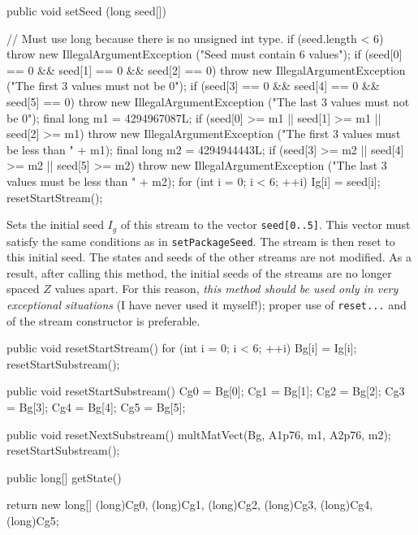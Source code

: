 \begin{code}

   public void setSeed (long seed[]) \begin{hide} {
      // Must use long because there is no unsigned int type.
      if (seed.length < 6)
         throw new IllegalArgumentException ("Seed must contain 6 values");
      if (seed[0] == 0 && seed[1] == 0 && seed[2] == 0)
         throw new IllegalArgumentException
            ("The first 3 values must not be 0");
      if (seed[3] == 0 && seed[4] == 0 && seed[5] == 0)
         throw new IllegalArgumentException
            ("The last 3 values must not be 0");
      final long m1 = 4294967087L;
      if (seed[0] >= m1 || seed[1] >= m1 || seed[2] >= m1)
         throw new IllegalArgumentException
            ("The first 3 values must be less than " + m1);
      final long m2 = 4294944443L;
      if (seed[3] >= m2 || seed[4] >= m2 || seed[5] >= m2)
         throw new IllegalArgumentException
            ("The last 3 values must be less than " + m2);
      for (int i = 0; i < 6;  ++i)
         Ig[i] = seed[i];
      resetStartStream();
   }\end{hide}
\end{code}
 \begin{tabb}  Sets the initial seed $I_g$ of this stream
  to the vector \texttt{seed[0..5]}.  This vector must satisfy the same
  conditions as in \texttt{setPackageSeed}.
  The stream is then reset to this initial seed.
  The states and seeds of the other streams are not modified.
  As a result, after calling this method, the initial seeds
  of the streams are no longer spaced $Z$ values apart.
  For this reason, \emph{this method should be used only in very
  exceptional situations} (I have never used it myself!);
  proper use of \texttt{reset...}
  and of the stream constructor is preferable.
 \end{tabb}
\begin{htmlonly}
\end{htmlonly}
\begin{code}
\begin{hide}
   public void resetStartStream()  {
      for (int i = 0; i < 6;  ++i)
         Bg[i] = Ig[i];
      resetStartSubstream();
   }

   public void resetStartSubstream()  {
      Cg0 = Bg[0];
      Cg1 = Bg[1];
      Cg2 = Bg[2];
      Cg3 = Bg[3];
      Cg4 = Bg[4];
      Cg5 = Bg[5];
   }

   public void resetNextSubstream()  {
      multMatVect(Bg, A1p76, m1, A2p76, m2);
      resetStartSubstream();
   }

\end{hide}
   public long[] getState() \begin{hide} {
      return new long[] {(long)Cg0, (long)Cg1, (long)Cg2,
                         (long)Cg3, (long)Cg4, (long)Cg5};
   } \end{hide}
\end{code}
